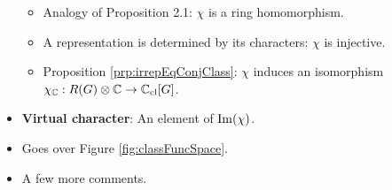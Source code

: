 \documentclass[../notes.tex]{subfiles}
\begin{document}
\begin{itemize}
    \begin{itemize}
        \item Analogy of Proposition 2.1: $\chi$ is a ring homomorphism.
        \item A representation is determined by its characters: $\chi$ is injective.
        \item Proposition \ref{prp:irrepEqConjClass}: $\chi$ induces an isomorphism $\chi_{\mathbb{C}}:R(G)\otimes\mathbb{C}\to\mathbb{C}_\text{cl}[G]$.
    \end{itemize}
    \item \textbf{Virtual character}: An element of $\operatorname{Im}(\chi)$.
    \item Goes over Figure \ref{fig:classFuncSpace}.
    \item A few more comments.
\end{itemize}
\end{document}
